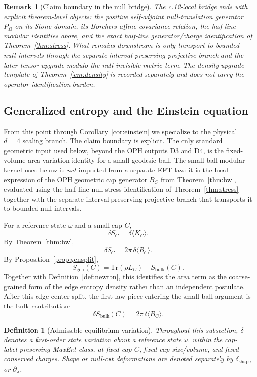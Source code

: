 \documentclass[11pt]{article}
\newtheorem{definition}[theorem]{Definition}
\newtheorem{remark}[theorem]{Remark}
\begin{document}
\begin{remark}[Claim boundary in the null bridge]
The c.12-local bridge ends with explicit theorem-level objects: the positive self-adjoint null-translation generator \(P_\Omega\) on its Stone domain, its Borchers affine covariance relation, the half-line modular identities above, and the exact half-line generator/charge identification of Theorem~\ref{thm:stress}. What remains downstream is only transport to bounded null intervals through the separate interval-preserving projective branch and the later tensor upgrade modulo the null-invisible metric term. The density-upgrade template of Theorem~\ref{lem:density} is recorded separately and does not carry the operator-identification burden.
\end{remark}
\subsection{Generalized entropy and the Einstein equation}

From this point through Corollary~\ref{cor:einstein} we specialize to the physical $d=4$ scaling branch. The claim boundary is explicit. The only standard geometric input used below, beyond the OPH outputs D3 and D4, is the fixed-volume area-variation identity for a small geodesic ball. The small-ball modular kernel used below is \emph{not} imported from a separate EFT law: it is the local expression of the OPH geometric cap generator $B_C$ from Theorem~\ref{thm:bw}, evaluated using the half-line null-stress identification of Theorem~\ref{thm:stress} together with the separate interval-preserving projective branch that transports it to bounded null intervals.

For a reference state $\omega$ and a small cap $C$,
\[
\delta S_C=\delta \langle K_C\rangle.
\]
By Theorem~\ref{thm:bw},
\[
\delta S_C = 2\pi\,\delta\langle B_C\rangle.
\]
By Proposition~\ref{prop:gensplit},
\[
S_{\mathrm{gen}}(C)=\mathrm{Tr}(\rho L_C)+S_{\mathrm{bulk}}(C).
\]
Together with Definition~\ref{def:newton}, this identifies the area term as the coarse-grained form of the edge entropy density rather than an independent postulate. After this edge-center split, the first-law piece entering the small-ball argument is the bulk contribution:
\[
\delta S_{\mathrm{bulk}}(C)=2\pi\,\delta\langle B_C\rangle.
\]

\begin{definition}[Admissible equilibrium variation]
Throughout this subsection, $\delta$ denotes a first-order state variation about a reference state $\omega$, within the cap-label-preserving MaxEnt class, at fixed cap $C$, fixed cap size/volume, and fixed conserved charges. Shape or null-cut deformations are denoted separately by $\delta_{\mathrm{shape}}$ or $\partial_\lambda$.
\end{definition}
\end{document}
